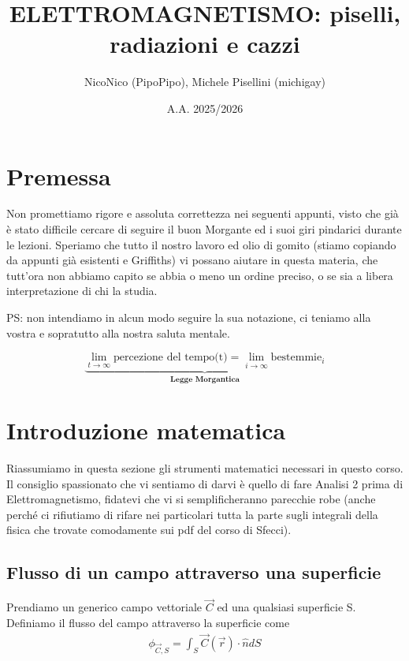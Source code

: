 \documentclass{book}
\title{ELETTROMAGNETISMO: piselli, radiazioni e cazzi}
\author{NicoNico (PipoPipo), Michele Pisellini (michigay)}
\date{A.A. 2025/2026}
\begin{document}
\maketitle
\chapter*{Premessa}
     Non promettiamo rigore e assoluta correttezza nei seguenti appunti, visto che già è stato difficile cercare di seguire il buon Morgante ed i suoi giri pindarici durante le lezioni. Speriamo che tutto il nostro lavoro ed olio di gomito (stiamo copiando da appunti già esistenti e Griffiths) vi possano aiutare in questa materia, che tutt'ora non abbiamo capito se abbia o meno un ordine preciso, o se sia a libera interpretazione di chi la studia. 
    
    PS: non intendiamo in alcun modo seguire la sua notazione, ci teniamo alla vostra e sopratutto alla nostra saluta mentale. 


 

\[    
\underbrace{\lim_{t\to \infty} \text{percezione del tempo(t)} = \lim_{i\to \infty}\text{bestemmie}_i}_{\textbf{Legge Morgantica}} 
\]






\newpage
\tableofcontents

\newpage




\chapter{Introduzione matematica}
Riassumiamo in questa sezione gli strumenti matematici necessari in questo corso. Il consiglio spassionato che vi sentiamo di darvi è quello di fare Analisi 2 prima di Elettromagnetismo, fidatevi che vi si semplificheranno parecchie robe (anche perché ci rifiutiamo di rifare nei particolari tutta la parte sugli integrali della fisica che trovate comodamente sui pdf del corso di Sfecci).



\section{Flusso di un campo attraverso una superficie}
Prendiamo un generico campo vettoriale $\vec{C}$ ed una qualsiasi superficie S. Definiamo il flusso del campo attraverso la superficie come 
\begin{align*}
    \phi_{\vec{C}, S} = \int_S \vec{C}(\vec{r}) \cdot \hat{n} dS
\end{align*}
\end{document}
